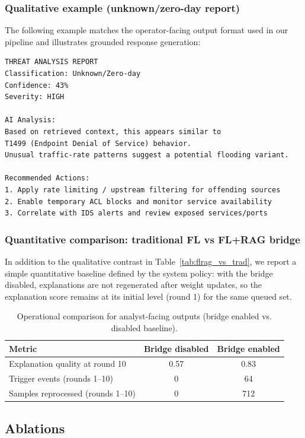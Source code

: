 \documentclass[conference]{IEEEtran}
\begin{document}
\subsubsection{Qualitative example (unknown/zero-day report)}
The following example matches the operator-facing output format used in our pipeline and illustrates grounded response generation:

\begin{verbatim}
THREAT ANALYSIS REPORT
Classification: Unknown/Zero-day
Confidence: 43%
Severity: HIGH

AI Analysis:
Based on retrieved context, this appears similar to
T1499 (Endpoint Denial of Service) behavior.
Unusual traffic-rate patterns suggest a potential flooding variant.

Recommended Actions:
1. Apply rate limiting / upstream filtering for offending sources
2. Enable temporary ACL blocks and monitor service availability
3. Correlate with IDS alerts and review exposed services/ports
\end{verbatim}

\subsubsection{Quantitative comparison: traditional FL vs FL+RAG bridge}
In addition to the qualitative contrast in Table~\ref{tab:flrag_vs_trad}, we report a simple quantitative baseline defined by the system policy: with the bridge disabled, explanations are not regenerated after weight updates, so the explanation score remains at its initial level (round 1) for the same queued set.

\begin{table}[t]
\caption{Operational comparison for analyst-facing outputs (bridge enabled vs. disabled baseline).}
\label{tab:bridge_quant}
\centering
\begin{tabular}{lcc}
\toprule
\textbf{Metric} & \textbf{Bridge disabled} & \textbf{Bridge enabled}\\
\midrule
Explanation quality at round 10 & 0.57 & 0.83\\
Trigger events (rounds 1--10) & 0 & 64\\
Samples reprocessed (rounds 1--10) & 0 & 712\\
\bottomrule
\end{tabular}
\end{table}
\subsection{Ablations}
\label{sec:ablations}
\end{document}
